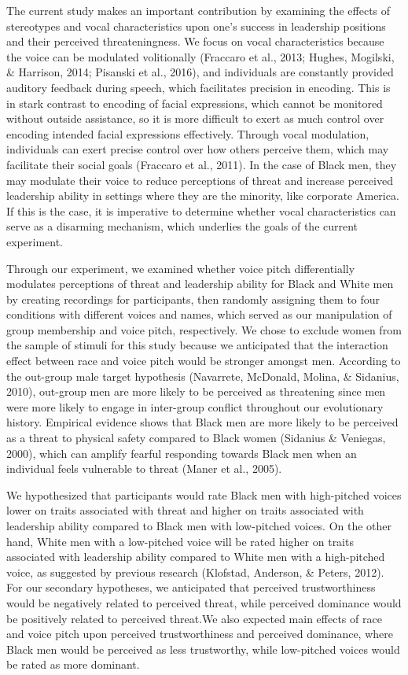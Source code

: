 \documentclass[
  english,
  man]{apa6}
\begin{document}
The current study makes an important contribution by examining the effects of stereotypes and vocal characteristics upon one's success in leadership positions and their perceived threateningness. We focus on vocal characteristics because the voice can be modulated volitionally (Fraccaro et al., 2013; Hughes, Mogilski, \& Harrison, 2014; Pisanski et al., 2016), and individuals are constantly provided auditory feedback during speech, which facilitates precision in encoding. This is in stark contrast to encoding of facial expressions, which cannot be monitored without outside assistance, so it is more difficult to exert as much control over encoding intended facial expressions effectively. Through vocal modulation, individuals can exert precise control over how others perceive them, which may facilitate their social goals (Fraccaro et al., 2011). In the case of Black men, they may modulate their voice to reduce perceptions of threat and increase perceived leadership ability in settings where they are the minority, like corporate America. If this is the case, it is imperative to determine whether vocal characteristics can serve as a disarming mechanism, which underlies the goals of the current experiment.

Through our experiment, we examined whether voice pitch differentially modulates perceptions of threat and leadership ability for Black and White men by creating recordings for participants, then randomly assigning them to four conditions with different voices and names, which served as our manipulation of group membership and voice pitch, respectively. We chose to exclude women from the sample of stimuli for this study because we anticipated that the interaction effect between race and voice pitch would be stronger amongst men. According to the out-group male target hypothesis (Navarrete, McDonald, Molina, \& Sidanius, 2010), out-group men are more likely to be perceived as threatening since men were more likely to engage in inter-group conflict throughout our evolutionary history. Empirical evidence shows that Black men are more likely to be perceived as a threat to physical safety compared to Black women (Sidanius \& Veniegas, 2000), which can amplify fearful responding towards Black men when an individual feels vulnerable to threat (Maner et al., 2005).

We hypothesized that participants would rate Black men with high-pitched voices lower on traits associated with threat and higher on traits associated with leadership ability compared to Black men with low-pitched voices. On the other hand, White men with a low-pitched voice will be rated higher on traits associated with leadership ability compared to White men with a high-pitched voice, as suggested by previous research (Klofstad, Anderson, \& Peters, 2012). For our secondary hypotheses, we anticipated that perceived trustworthiness would be negatively related to perceived threat, while perceived dominance would be positively related to perceived threat.We also expected main effects of race and voice pitch upon perceived trustworthiness and perceived dominance, where Black men would be perceived as less trustworthy, while low-pitched voices would be rated as more dominant.
\end{document}
